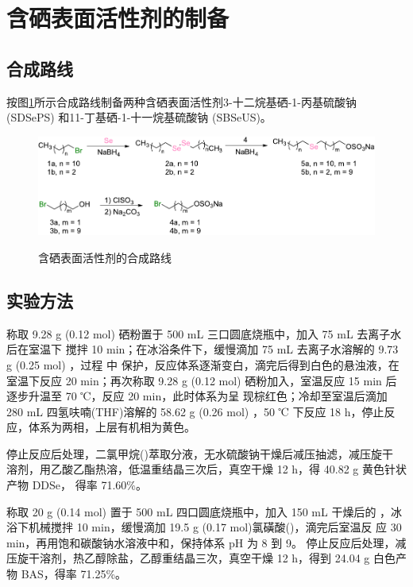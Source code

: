 \documentclass[bachelor,fandolfonts,replaceperiod]{jnuthesis}
\begin{document}
    \section{含硒表面活性剂的制备}
    \subsection{合成路线}
    按图\ref{fig:synthesis-scheme}所示合成路线制备两种含硒表面活性剂3-十二烷基硒-1-丙基硫酸钠 
    (SDSePS) 和11-丁基硒-1-十一烷基硫酸钠 (SBSeUS)。
    \begin{figure}[htbp]
        \centering
        \includegraphics[scale=0.92]{figure/synthesis-scheme.pdf}\\
        \caption{含硒表面活性剂的合成路线}\label{fig:synthesis-scheme}
    \end{figure}

    \subsection{实验方法}
    称取 9.28 g (0.12 mol) 硒粉置于 500 mL 三口圆底烧瓶中，加入 75 mL 去离子水后在室温下
    搅拌 10 min；在冰浴条件下，缓慢滴加 75 mL 去离子水溶解的 9.73 g (0.25 mol) ，过程
    中  保护，反应体系逐渐变白，滴完后得到白色的悬浊液，在室温下反应 20 min；再次称取
    9.28 g (0.12 mol) 硒粉加入，室温反应 15 min 后逐步升温至 70 ℃，反应 20 min，此时体系为呈
    现棕红色；冷却至室温后滴加 280 mL 四氢呋喃(THF)溶解的 58.62 g (0.26 mol) ，50 ℃
    下反应 18 h，停止反应，体系为两相，上层有机相为黄色。
    
    停止反应后处理，二氯甲烷()萃取分液，无水硫酸钠干燥后减压抽滤，减压旋干
    溶剂，用乙酸乙酯热溶，低温重结晶三次后，真空干燥 12 h，得 40.82 g 黄色针状产物 DDSe，
    得率 71.60\%。
    
    称取 20 g (0.14 mol)  置于 500 mL 四口圆底烧瓶中，加入 150 mL 干燥后的
    ，冰浴下机械搅拌 10 min，缓慢滴加 19.5 g (0.17 mol)氯磺酸()，滴完后室温反
    应 30 min，再用饱和碳酸钠水溶液中和，保持体系 pH 为 8 到 9。
    停止反应后处理，减压旋干溶剂，热乙醇除盐，乙醇重结晶三次，真空干燥 12 h，得到
    24.04 g 白色产物 BAS，得率 71.25\%。
    
\end{document}
